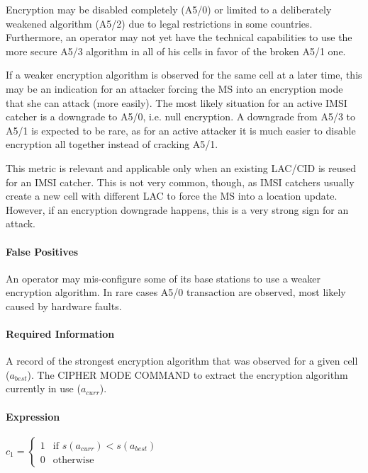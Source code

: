 \documentclass[a4paper,11pt,notitlepage,bigheadings,oneside]{scrartcl}
\begin{document}
Encryption may be disabled completely (A5/0) or limited to a deliberately
weakened algorithm (A5/2) due to legal restrictions in some countries.
Furthermore, an operator may not yet have the technical capabilities to use the
more secure A5/3 algorithm in all of his cells in favor of the broken A5/1 one.

If a weaker encryption algorithm is observed for the same cell at a later time,
this may be an indication for an attacker forcing the MS into an encryption
mode that she can attack (more easily). The most likely situation for an active
IMSI catcher is a downgrade to A5/0, i.e. null encryption. A downgrade from
A5/3 to A5/1 is expected to be rare, as for an active attacker it is much
easier to disable encryption all together instead of cracking A5/1.

This metric is relevant and applicable only when an existing LAC/CID is reused
for an IMSI catcher. This is not very common, though, as IMSI catchers usually
create a new cell with different LAC to force the MS into a location update.
However, if an encryption downgrade happens, this is a very strong sign for an
attack.

\paragraph{False Positives}

An operator may mis-configure some of its base stations to use a weaker
encryption algorithm. In rare cases A5/0 transaction are observed, most likely
caused by hardware faults.


\paragraph{Required Information}

A record of the strongest encryption algorithm that was observed for a given
cell ($a_{best}$). The CIPHER MODE COMMAND to extract the encryption algorithm
currently in use ($a_{curr}$).

\paragraph{Expression}

$c_1 =
\begin{cases}
	1 & \text{if } s(a_{curr}) < s(a_{best}) \\
	0 & \text{otherwise}
\end{cases}$
\end{document}
